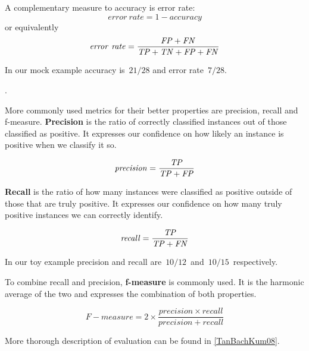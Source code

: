 A complementary measure to accuracy is error rate:
\begin{equation}
\mathit{error~rate} = 1 - \mathit{accuracy}
\end{equation}
or equivalently
\begin{equation}
\mathit{error~rate} = \frac{\mathit{FP} + \mathit{FN}}{\mathit{TP} + \mathit{TN} + \mathit{FP} + \mathit{FN}}
\end{equation}

In our mock example accuracy is~$21/28$ and error rate~$7/28$.

.

More commonly used metrics for their better properties are precision, recall and f-measure.
{\bf Precision} is the ratio of correctly classified instances out of those classified as positive.
It expresses our confidence on how likely an instance is positive when we classify it so.

\begin{equation}
\mathit{precision} = \frac{\mathit{TP}}{\mathit{TP} + \mathit{FP}}
\end{equation}

{\bf Recall} is the ratio of how many instances were classified as positive
outside of those that are truly positive.
It expresses our confidence on how many truly positive instances we can correctly identify.

\begin{equation}
\mathit{recall} = \frac{\mathit{TP}}{\mathit{TP} + \mathit{FN}}
\end{equation}

In our toy example precision and recall are~$10/12$~and~$10/15$~respectively.

To combine recall and precision, {\bf f-measure} is commonly used.
It is the harmonic average of the two and expresses the combination of both properties.

\begin{equation}
	\mathit{F-measure} = 2 \times \frac{\mathit{precision}\times \mathit{recall}}{\mathit{precision} + \mathit{recall}}
\end{equation}


More thorough description of evaluation can be found in \autoref{TanBachKum08}.



\subsection{}

